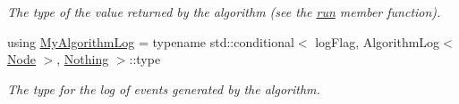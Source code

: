 \begin{DoxyCompactItemize}
\begin{DoxyCompactList}\small\item\em The type of the value returned by the algorithm (see the \hyperlink{structslb_1_1ext_1_1algorithm_1_1PerGoal_a0f8d76dcf8c165e05c9af4e2b2c2659f}{run} member function). \end{DoxyCompactList}\item 
using \hyperlink{structslb_1_1ext_1_1algorithm_1_1PerGoal_a28d1e8e647aeaf2c2b8f6136d6839d51}{My\+Algorithm\+Log} = typename std\+::conditional$<$ log\+Flag, Algorithm\+Log$<$ \hyperlink{structslb_1_1ext_1_1algorithm_1_1PerGoal_a9b32c53525e6e61f5bf71a901a461c44}{Node} $>$, \hyperlink{structslb_1_1Nothing}{Nothing} $>$\+::type\hypertarget{structslb_1_1ext_1_1algorithm_1_1PerGoal_a28d1e8e647aeaf2c2b8f6136d6839d51}{}\label{structslb_1_1ext_1_1algorithm_1_1PerGoal_a28d1e8e647aeaf2c2b8f6136d6839d51}

\begin{DoxyCompactList}\small\item\em The type for the log of events generated by the algorithm. \end{DoxyCompactList}\end{DoxyCompactItemize}
